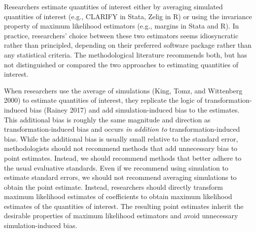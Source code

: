 \documentclass[12pt]{article}
\begin{document}
Researchers estimate quantities of interest either by averaging simulated quantities of interest (e.g., CLARIFY in Stata, Zelig in R) or using the invariance property of maximum likelihood estimators (e.g., margins in Stata and R). In practice, researchers' choice between these two estimators seems idiosyncratic rather than principled, depending on their preferred software package rather than any statistical criteria. The methodological literature recommends both, but has not distinguished or compared the two approaches to estimating quantities of interest.

When researchers use the average of simulations (King, Tomz, and Wittenberg 2000) to estimate quantities of interest, they replicate the logic of transformation-induced bias (Rainey 2017) and add simulation-induced bias to the estimates. This additional bias is roughly the same magnitude and direction as transformation-induced bias and occurs \textit{in addition to} transformation-induced bias. While the additional bias is usually small relative to the standard error, methodologists should not recommend methods that add unnecessary bias to point estimates. Instead, we should recommend methods that better adhere to the usual evaluative standards. Even if we recommend using simulation to estimate standard errors, we should not recommend averaging simulations to obtain the point estimate. Instead, researchers should directly transform maximum likelihood estimates of coefficients to obtain maximum likelihood estimates of the quantities of interest. The resulting point estimates inherit the desirable properties of maximum likelihood estimators and avoid unnecessary simulation-induced bias.

\singlespace
\small


\end{document}
